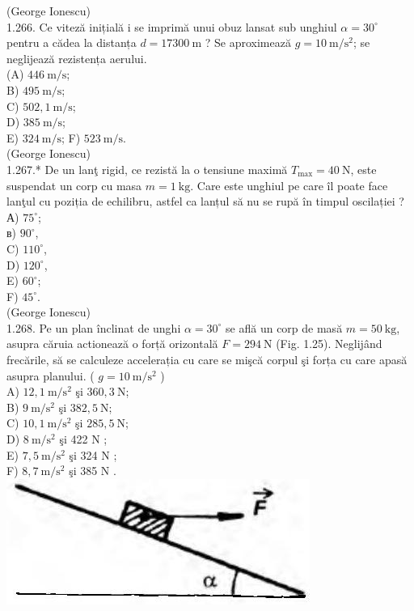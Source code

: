 \documentclass[10pt]{article}
\begin{document}
(George Ionescu)\\
1.266. Ce viteză inițială i se imprimă unui obuz lansat sub unghiul $\alpha=30^{\circ}$ pentru a cădea la distanța $d=17300 \mathrm{~m}$ ? Se aproximează $g=10 \mathrm{~m} / \mathrm{s}^{2}$; se neglijează rezistența aerului.\\
(A) $446 \mathrm{~m} / \mathrm{s}$;\\
B) $495 \mathrm{~m} / \mathrm{s}$;\\
C) $502,1 \mathrm{~m} / \mathrm{s}$;\\
D) $385 \mathrm{~m} / \mathrm{s}$;\\
E) $324 \mathrm{~m} / \mathrm{s}$; F) $523 \mathrm{~m} / \mathrm{s}$.\\
(George Ionescu)\\
1.267.* De un lanţ rigid, ce rezistă la o tensiune maximă $T_{\max }=40 \mathrm{~N}$, este suspendat un corp cu masa $m=1 \mathrm{~kg}$. Care este unghiul pe care îl poate face lanţul cu poziția de echilibru, astfel ca lanțul să nu se rupă în timpul oscilației ?\\
А) $75^{\circ}$;\\
в) $90^{\circ}$,\\
C) $110^{\circ}$,\\
D) $120^{\circ}$,\\
E) $60^{\circ}$;\\
F) $45^{\circ}$.\\
(George Ionescu)\\
1.268. Pe un plan înclinat de unghi $\alpha=30^{\circ}$ se află un corp de masă $m=50 \mathrm{~kg}$, asupra căruia actionează o forță orizontală $F=294 \mathrm{~N}$ (Fig. 1.25). Neglijând frecările, să se calculeze accelerația cu care se mişcă corpul şi forța cu care apasă asupra planului. ( $g=10 \mathrm{~m} / \mathrm{s}^{2}$ )\\
A) $12,1 \mathrm{~m} / \mathrm{s}^{2}$ şi $360,3 \mathrm{~N}$;\\
B) $9 \mathrm{~m} / \mathrm{s}^{2}$ şi $382,5 \mathrm{~N}$;\\
C) $10,1 \mathrm{~m} / \mathrm{s}^{2}$ şi $285,5 \mathrm{~N}$;\\
D) $8 \mathrm{~m} / \mathrm{s}^{2}$ şi 422 N ;\\
E) $7,5 \mathrm{~m} / \mathrm{s}^{2}$ şi 324 N ;\\
F) $8,7 \mathrm{~m} / \mathrm{s}^{2}$ şi 385 N .\\
\includegraphics[max width=\textwidth, center]{2025_07_01_5b3ff9fa0d508c8e9f17g-061(1)}
\end{document}
